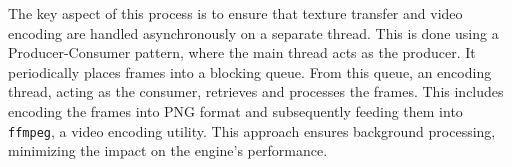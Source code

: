 The key aspect of this process is to ensure that texture transfer and video encoding are handled asynchronously on a separate thread. This is done using a Producer-Consumer pattern, where the main thread acts as the producer. It periodically places frames into a blocking queue. From this queue, an encoding thread, acting as the consumer, retrieves and processes the frames. This includes encoding the frames into PNG format and subsequently feeding them into \verb|ffmpeg|, a video encoding utility. This approach ensures background processing, minimizing the impact on the engine's performance.

